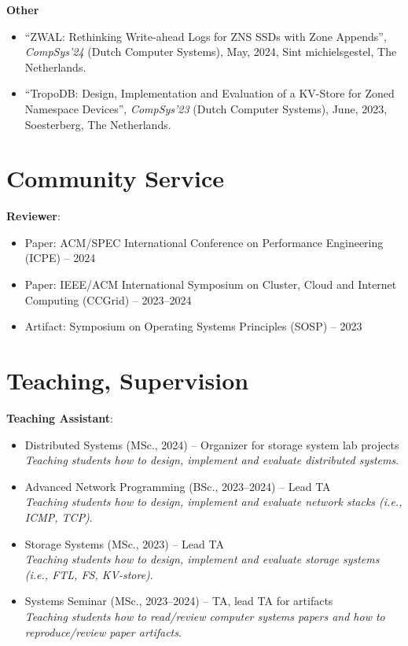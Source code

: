 \documentclass[letterpaper,11pt]{article}
\begin{document}
    \textbf{Other}
    \begin{itemize}[label={}]
    \item
      ``ZWAL: Rethinking Write-ahead Logs for ZNS SSDs with Zone Appends'',
      \textit{CompSys'24} (Dutch Computer Systems), May, 2024, Sint michielsgestel, The Netherlands.
    
    \item
      ``TropoDB: Design, Implementation and Evaluation of a KV-Store for Zoned Namespace Devices'',
      \textit{CompSys'23} (Dutch Computer Systems), June, 2023, Soesterberg, The Netherlands.
    \end{itemize}

\section{Community Service}
\textbf{Reviewer}:
\begin{itemize}
\itemsep0em
\item Paper: ACM/SPEC International Conference on Performance Engineering (ICPE) -- 2024
\item Paper: IEEE/ACM International Symposium on Cluster, Cloud and Internet Computing (CCGrid) -- 2023--2024
\item Artifact: Symposium on Operating Systems Principles (SOSP) -- 2023
\end{itemize}

\section{Teaching, Supervision}
\textbf{Teaching Assistant}:
\begin{itemize}[label={}]
\itemsep0em
  \item Distributed Systems (MSc., 2024) -- Organizer for storage system lab projects\\
  \textit{Teaching students how to design, implement and evaluate distributed systems}.
  
  \item Advanced Network Programming (BSc., 2023--2024) -- Lead TA\\
  \textit{Teaching students how to design, implement and evaluate network stacks (i.e., ICMP, TCP)}.

  \item Storage Systems (MSc., 2023) -- Lead TA\\
  \textit{Teaching students how to design, implement and evaluate storage systems (i.e., FTL, FS, KV-store)}.

  \item Systems Seminar (MSc., 2023--2024) -- TA, lead TA for artifacts\\
  \textit{Teaching students how to read/review computer systems papers and how to reproduce/review paper artifacts}.
\end{itemize}
\end{document}
